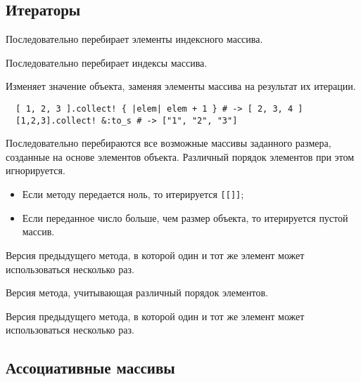 \subsection*{Итераторы}

\begin{methodlist}
  Последовательно перебирает элементы индексного массива. 

  Последовательно перебирает индексы массива.

  Изменяет значение объекта, заменяя элементы массива на результат их итерации.
  \begin{verbatim}
  [ 1, 2, 3 ].collect! { |elem| elem + 1 } # -> [ 2, 3, 4 ]
  [1,2,3].collect! &:to_s # -> ["1", "2", "3"]
  \end{verbatim}
  

  Последовательно перебираются все возможные массивы заданного размера, созданные на основе элементов объекта. Различный порядок элементов при этом игнорируется.
  \begin{itemize}
    \item Если методу передается ноль, то итерируется \verb![[]]!;
    \item Если переданное число больше, чем размер объекта, то итерируется пустой массив.
  \end{itemize}
  
  Версия предыдущего метода, в которой один и тот же элемент может использоваться несколько раз.

  Версия метода, учитывающая различный порядок элементов.

  Версия предыдущего метода, в которой один и тот же элемент может использоваться несколько раз. 
\end{methodlist}

\subsection*{Ассоциативные массивы}

